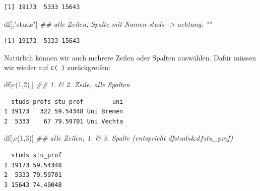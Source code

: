 \documentclass[
  letterpaper,
  DIV=11,
  numbers=noendperiod]{scrreprt}
\newenvironment{Shaded}{\begin{snugshade}}{\end{snugshade}}
\newcommand{\DecValTok}[1]{\textcolor[rgb]{0.68,0.00,0.00}{#1}}
\newcommand{\DocumentationTok}[1]{\textcolor[rgb]{0.37,0.37,0.37}{\textit{#1}}}
\newcommand{\FunctionTok}[1]{\textcolor[rgb]{0.28,0.35,0.67}{#1}}
\newcommand{\NormalTok}[1]{\textcolor[rgb]{0.00,0.46,0.62}{#1}}
\newcommand{\StringTok}[1]{\textcolor[rgb]{0.13,0.47,0.30}{#1}}
\begin{document}
\begin{Shaded}
\end{Shaded}

\begin{verbatim}
[1] 19173  5333 15643
\end{verbatim}

\begin{Shaded}
\begin{Highlighting}[]
\NormalTok{df[,}\StringTok{"studs"}\NormalTok{] }\DocumentationTok{\#\# alle Zeilen, Spalte mit Namen studs {-}\textgreater{} achtung: ""}
\end{Highlighting}
\end{Shaded}

\begin{verbatim}
[1] 19173  5333 15643
\end{verbatim}

Natürlich können wir auch mehrere Zeilen oder Spalten auswählen. Dafür
müssen wir wieder auf \texttt{c(\ )} zurückgreifen:

\begin{Shaded}
\begin{Highlighting}[]
\NormalTok{df[}\FunctionTok{c}\NormalTok{(}\DecValTok{1}\NormalTok{,}\DecValTok{2}\NormalTok{),]  }\DocumentationTok{\#\# 1. \& 2. Zeile, alle Spalten}
\end{Highlighting}
\end{Shaded}

\begin{verbatim}
  studs profs stu_prof        uni
1 19173   322 59.54348 Uni Bremen
2  5333    67 79.59701 Uni Vechta
\end{verbatim}

\begin{Shaded}
\begin{Highlighting}[]
\NormalTok{df[,}\FunctionTok{c}\NormalTok{(}\DecValTok{1}\NormalTok{,}\DecValTok{3}\NormalTok{)]  }\DocumentationTok{\#\# alle Zeilen, 1. \& 3. Spalte (entspricht df$studs \& df$stu\_prof)}
\end{Highlighting}
\end{Shaded}

\begin{verbatim}
  studs stu_prof
1 19173 59.54348
2  5333 79.59701
3 15643 74.49048
\end{verbatim}
\end{document}
